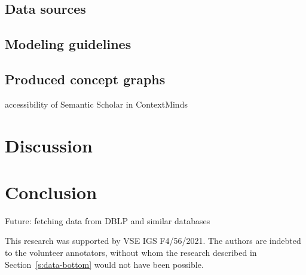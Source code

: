 \documentclass{kerauth}
\begin{document}
\subsection{Data sources}
\label{s:data-goal}

\subsection{Modeling guidelines}
\label{s:guid}

\subsection{Produced concept graphs}
\label{s:graps}

accessibility of Semantic Scholar in ContextMinds

\section{Discussion}

\section{Conclusion}
\label{s:concl}

Future: fetching data from DBLP and similar databases

\acks
This research was supported by VSE IGS F4/56/2021.
The authors are indebted to the volunteer annotators, without whom the research described in Section~\ref{s:data-bottom} would not have been possible. %


\end{document}
